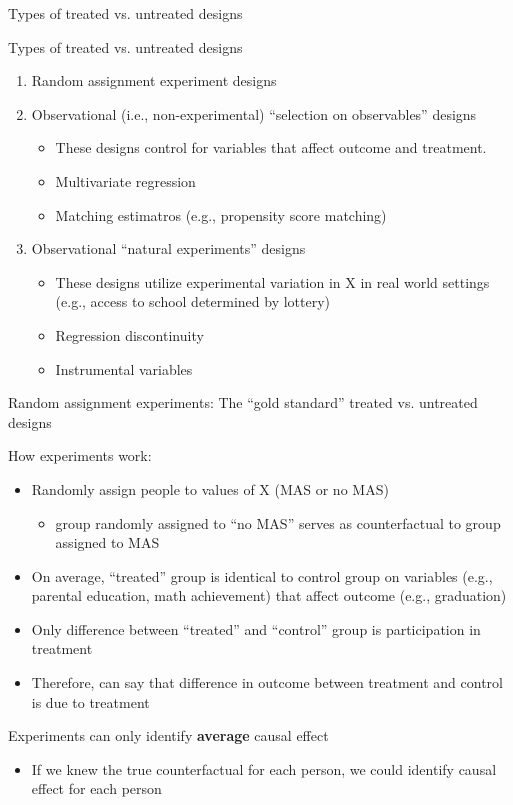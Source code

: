 \begin{frame}{Types of treated vs. untreated designs}


		Types of treated vs. untreated designs				
		\begin{enumerate}
			\item Random assignment experiment designs
			\item Observational (i.e., non-experimental) ``selection on observables'' designs
			\begin{itemize}
				\item These designs control for variables that affect outcome and treatment. 
				\item Multivariate regression
				\item Matching estimatros (e.g., propensity score matching)
			\end{itemize}
			\item Observational ``natural experiments'' designs
			\begin{itemize}
				\item These designs utilize experimental variation in X in real world settings (e.g., access to school determined by lottery)
				\item Regression discontinuity
				\item Instrumental variables
			\end{itemize}
			
		\end{enumerate}
	
\end{frame}

\begin{frame}{Random assignment experiments: The ``gold standard'' treated vs. untreated designs}

	How experiments work:
	\begin{itemize}
		\item Randomly assign people to values of X (MAS or no MAS)
		\begin{itemize}
			\item group randomly assigned to ``no MAS'' serves as counterfactual to group assigned to MAS
		\end{itemize}
		\item On average, ``treated'' group is identical to control group on variables (e.g., parental education, math achievement) that affect outcome (e.g., graduation)
		\item Only difference between ``treated'' and ``control'' group is participation in treatment
		\item Therefore, can say that difference in outcome between treatment and control is due to treatment
	\end{itemize}
	\vspace{2mm}
	Experiments can only identify \textbf{average} causal effect	
	\begin{itemize}
	\item If we knew the true counterfactual for each person, we could identify causal effect for each person

	\end{itemize}

\end{frame}

